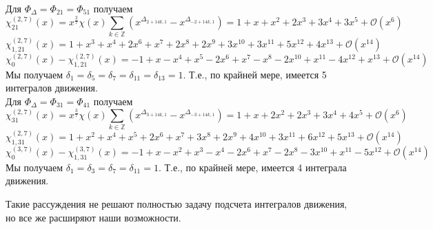 \documentclass[12pt]{article}
\theoremstyle{definition}
\begin{document}
\begin{itemize}
\begin{equation}
    \end{equation}
    Для $\Phi_\Delta =\Phi_{21}=\Phi_{51}$ получаем
    \begin{equation}
        \chi^{(2,7)}_{21}(x)=x^{\frac{2}{7}}\chi(x)\sum\limits_{k\in\mathbb{Z}}(x^{\Delta_{2+14k,1}}-x^{\Delta_{-2+14k,1}})=1+x+x^2+2x^3+3x^4+3x^5+\mathcal{O}(x^6)
    \end{equation}
    \begin{equation}
        \chi^{(2,7)}_{1,21}(x)=1+x^3+x^4+2x^6+x^7+2x^8+2x^9+3x^{10}+3x^{11}+5x^{12}+4x^{13}+\mathcal{O}(x^{14})
    \end{equation}
    \begin{equation}
        \chi^{(2,7)}_0(x)-\chi^{(2,7)}_{1,21}(x)=-1+x-x^4+x^5-2x^6+x^7-x^8-2x^{10}+x^{11}-4x^{12}+x^{13}+\mathcal{O}(x^{14})
    \end{equation}
    Мы получаем $\delta_1=\delta_5=\delta_7=\delta_{11}=\delta_{13}=1$. Т.е., по крайней мере, имеется 5 интегралов движения.\\
    Для $\Phi_\Delta =\Phi_{31}=\Phi_{41}$ получаем
    \begin{equation}
        \chi^{(2,7)}_{31}(x)=x^{\frac{3}{7}}\chi(x)\sum\limits_{k\in\mathbb{Z}}(x^{\Delta_{3+14k,1}}-x^{\Delta_{-3+14k,1}})=1+x+2x^2+2x^3+3x^4+4x^5+\mathcal{O}(x^6)
    \end{equation}
    \begin{equation}
        \chi^{(2,7)}_{1,31}(x)=1+x^2+x^4+x^5+2x^6+x^7+3x^8+2x^9+4x^{10}+3x^{11}+6x^{12}+5x^{13}+\mathcal{O}(x^{14})
    \end{equation}
    \begin{equation}
        \chi^{(3,7)}_0(x)-\chi^{(3,7)}_{1,31}(x)=-1+x-x^2+x^3-x^4-2x^6+x^7-2x^8-3x^{10}+x^{11}-5x^{12}+\mathcal{O}(x^{14})
    \end{equation}
    Мы получаем $\delta_1=\delta_3=\delta_7=\delta_{11}=1$. Т.е., по крайней мере, имеется 4 интеграла движения.
\end{itemize}
Такие рассуждения не решают полностью задачу подсчета интегралов движения, но все же расширяют наши возможности.
\end{document}
